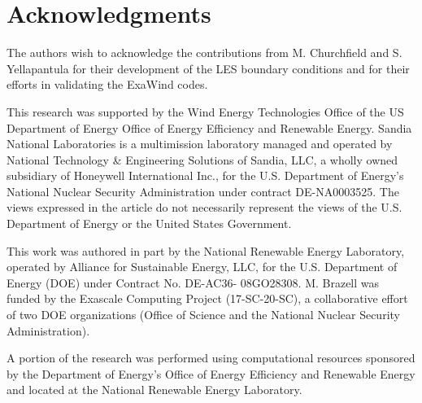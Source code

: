 \documentclass[conf]{new-aiaa}
\begin{document}

\section*{Acknowledgments}

The authors wish to acknowledge the contributions from M. Churchfield
and S. Yellapantula for their development of the LES boundary
conditions and for their efforts in validating the ExaWind codes.

This research was supported by the Wind Energy Technologies Office of
the US Department of Energy Office of Energy Efficiency and Renewable
Energy.  Sandia National Laboratories is a multimission laboratory
managed and operated by National Technology \& Engineering Solutions
of Sandia, LLC, a wholly owned subsidiary of Honeywell International
Inc., for the U.S. Department of Energy's National Nuclear Security
Administration under contract DE-NA0003525. The views expressed in the
article do not necessarily represent the views of the U.S. Department
of Energy or the United States Government.

This work was authored in part by the National Renewable Energy
Laboratory, operated by Alliance for Sustainable Energy, LLC, for the
U.S. Department of Energy (DOE) under Contract No. DE-AC36-
08GO28308. M. Brazell was funded by the Exascale Computing
Project (17-SC-20-SC), a collaborative effort of two DOE organizations
(Office of Science and the National Nuclear Security Administration).

A portion of the research was performed using computational
resources sponsored by the Department of Energy's Office of Energy
Efficiency and Renewable Energy and located at the National Renewable
Energy Laboratory.


\end{document}
